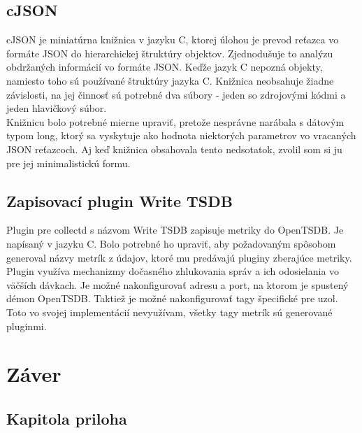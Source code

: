 \documentclass[11pt,final,oneside]{fithesis}
\begin{document}
\section{cJSON}
cJSON je miniatúrna knižnica v jazyku C, ktorej úlohou je prevod reťazca vo formáte JSON do hierarchickej štruktúry objektov. Zjednodušuje
to analýzu obdržaných informácií vo formáte JSON. Keďže jazyk C nepozná
objekty, namiesto toho sú používané štruktúry jazyka C. Knižnica neobsahuje žiadne závislosti, na jej činnosť sú potrebné dva súbory - 
jeden so zdrojovými kódmi a jeden hlavičkový súbor.
\\Knižnicu bolo potrebné mierne upraviť, pretože nesprávne narábala s dátovým typom long, ktorý sa vyskytuje ako hodnota niektorých parametrov
vo vracaných JSON reťazcoch. Aj keď knižnica obsahovala tento nedsotatok, zvolil som si ju pre jej minimalistickú formu.

\section{Zapisovací plugin Write TSDB}
Plugin pre collectd s názvom Write TSDB zapisuje metriky do OpenTSDB.\cite{13} Je napísaný v jazyku C. Bolo potrebné ho upraviť,
aby požadovaným spôsobom generoval názvy metrík z údajov, ktoré mu predávajú pluginy zberajúce metriky. Plugin využíva mechanizmy
dočasného zhlukovania správ a ich odosielania vo väčších dávkach. Je možné nakonfigurovať adresu a port, na ktorom je spustený
démon OpenTSDB. Taktiež je možné nakonfigurovať tagy špecifické pre uzol. Toto vo svojej implementácií nevyužívam,
všetky tagy metrík sú generované pluginmi.

\chapter{Záver}


\nocite{*}



\begin{appendix}
\chapter{Kapitola priloha}
\end{appendix}
\end{document}
